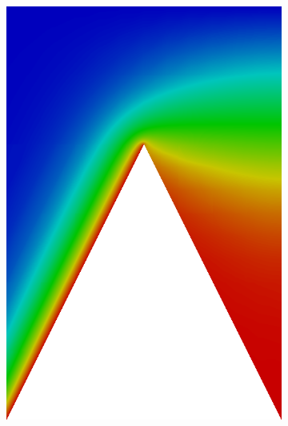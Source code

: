 \documentclass[letterpaper]{article}
\begin{document}
\begin{figure}[p]
\centering
\begin{subfigure}[t]{0.4\textwidth}
\centering
\includegraphics[width=\textwidth]{figs/Wedge/modified16nc.png}

\end{subfigure}
\end{figure}
\end{document}
